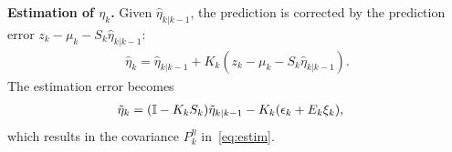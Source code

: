 \documentclass[letterpaper, 10 pt, conference]{ieeeconf}
\begin{document}
\textbf{Estimation of $\eta_k$.} Given $\hat{\eta}_{k|k-1}$, the prediction is corrected by the prediction error $z_k - \mu_{k}-S_{k}\hat{\eta}_{k|k-1}$:
\begin{align*}
    \hat{\eta}_k = \hat{\eta}_{k|k-1} + K_k (z_k - \mu_{k}-S_{k}\hat{\eta}_{k|k-1}).
\end{align*}
The estimation error becomes
\begin{align}
\tilde{\eta}_k &= (\mathbb{I}-K_kS_k)\tilde{\eta}_{k|k-1}-K_k(\epsilon_k+E_k\xi_k),
\label{eq:etatilde}
\end{align}
which results in the covariance $P_k^\eta$ in~\eqref{eq:estim}.
\end{document}
